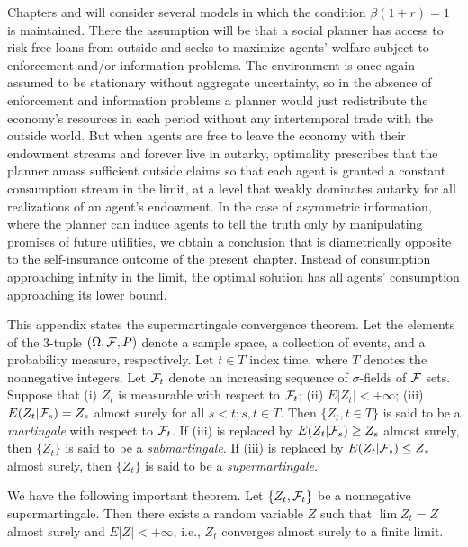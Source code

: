 Chapters  and  will consider several models in
which the condition $\beta (1+r)=1$ is maintained. There the assumption
will be that a social planner has access to risk-free loans from outside
 and seeks to maximize agents' welfare subject to enforcement
and/or information problems.  The environment is once again assumed to be
stationary without aggregate uncertainty, so in the absence of enforcement
and information problems a planner would just redistribute the
economy's resources in each period without any intertemporal trade
with the outside world.  But when agents are free to leave the economy
with their endowment streams and forever live in autarky, optimality
 prescribes that the  planner amass sufficient outside claims
so that each agent is granted a constant consumption stream in the limit, at
a level that weakly dominates autarky for all realizations of an agent's
endowment.  In the case of asymmetric information,  where the  planner
can  induce agents to tell the truth only by manipulating promises of future
utilities, we obtain a conclusion that is diametrically opposite to the
self-insurance outcome of the present chapter.  Instead of consumption
approaching infinity in the limit, the optimal solution has all agents'
consumption approaching its lower bound.

\label{app:Ach16}%
This appendix states the supermartingale convergence theorem.
Let the elements of the 3-tuple
$(\Omega,  {\cal F}, P)$ denote a sample space, a collection
of events, and a probability measure, respectively.
Let $t \in T$ index time, where $T$ denotes the nonnegative
integers.
Let ${\cal F}_t$ denote an increasing sequence of $\sigma$-fields
of ${\cal F}$ sets.
Suppose that
\medskip
\noindent(i)  $Z_t$ is measurable with respect to ${\cal F}_t$;
\medskip
\noindent(ii)  $E | Z_t   | < + \infty $;
\medskip
\noindent(iii) $ E(Z_t | {\cal F}_s) = Z_s$ almost surely for
all $s < t; s, t \in T$.
\medskip
\noindent Then $\{Z_t, t \in T\}$ is said to be a {\it martingale\/} with
respect to ${\cal F}_t$.
 If (iii) is replaced by
$E(Z_t | {\cal F}_s ) \geq Z_s$ almost surely, then
$\{Z_t\}$ is said to be a {\it submartingale\/}.
 If (iii) is replaced by
$E(Z_t | {\cal F}_s ) \leq Z_s$ almost surely, then
$\{Z_t\}$ is said to be a {\it supermartingale\/}.

\medskip
We have the following important theorem.
\medskip
{}  Let
$\{Z_t,   {\cal F}_t\}$ be a nonnegative supermartingale.
Then there exists a random variable
$Z$ such that $\lim Z_t = Z$ almost surely and
$E |Z| < + \infty$, i.e., $Z_t$ converges almost surely
to a finite limit.




